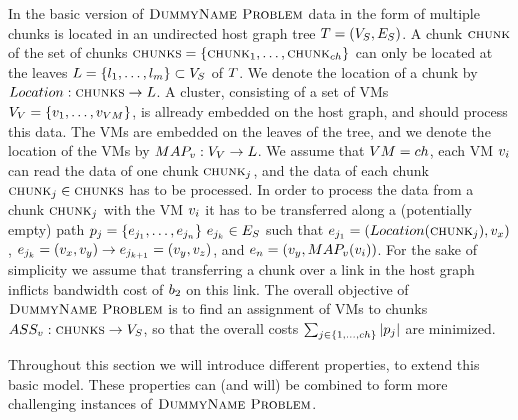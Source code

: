 In the basic version of $\textsc{DummyName Problem}$ data in the form of multiple chunks is 
located in an undirected host graph tree $T = (V_S, 
E_S)$. A chunk $\textsc{chunk}$ of the set of chunks $\textsc{chunks} = 
\{\textsc{chunk}_1,\dots,\textsc{chunk}_{ch}\}$ can only be located at the leaves 
$L = \{l_1,\dots,l_m\} \subset V_S$ of $T$. We 
denote the location of a chunk by $Location : \textsc{chunks} \rightarrow 
L$. A cluster, consisting of a set of VMs $V_V = 
\{v_1,\dots,v_{VM}\}$, is allready embedded on the host 
graph, and should process this data. The VMs are embedded on the 
leaves of the tree, and we denote the location of the VMs by $MAP_v : 
V_V \rightarrow L$. We assume that $VM = ch$, each 
VM $v_i$ can read the data of one chunk $\textsc{chunk}_j$, and the data of 
each chunk $\textsc{chunk}_j \in \textsc{chunks}$ has to be processed. In order to process the 
data from a chunk $\textsc{chunk}_j$ with the VM $v_i$ it has to be 
transferred along a (potentially empty) path $p_j = 
\{e_{j_1},\dots,e_{j_n}\} ~ e_{j_k} \in 
E_S$ such that $e_{j_1} = (Location(\textsc{chunk}_j), 
v_x)$, $e_{j_k} = (v_x, 
v_y) \rightarrow e_{j_{k+1}} = (v_y , 
v_z)$, and $e_n = (v_y, 
MAP_v(v_i))$.  For the sake of simplicity we assume that 
transferring a chunk over a link in the host graph inflicts bandwidth cost of 
$b_2$ on this link. The overall objective of $\textsc{DummyName Problem}$ is to find an 
assignment of VMs to chunks $ASS_v : \textsc{chunks} \rightarrow 
V_S$, so that the overall costs $\sum_{j \in 
\{1,\dots,ch\}} |p_j|$ are minimized.

Throughout this section we will introduce different properties, to extend this 
basic model. These properties can (and will) be combined to form more 
challenging instances of $\textsc{DummyName Problem}$.

